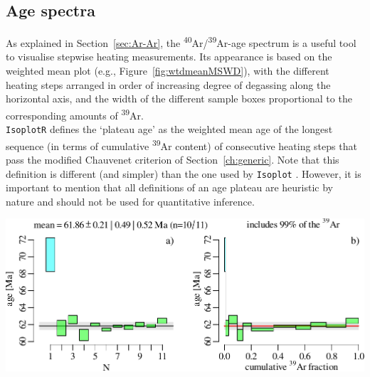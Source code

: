 \begin{refsection}
\section{Age spectra}\label{sec:agespectra}

As explained in Section~\ref{sec:Ar-Ar}, the
\textsuperscript{40}Ar/\textsuperscript{39}Ar-age spectrum is a useful
tool to visualise stepwise heating measurements. Its appearance is
based on the weighted mean plot (e.g., Figure~\ref{fig:wtdmeanMSWD}),
with the different heating steps arranged in order of increasing
degree of degassing along the horizontal axis, and the width of the
different sample boxes proportional to the corresponding amounts of
\textsuperscript{39}Ar.\\

\texttt{IsoplotR} defines the `plateau age' as the weighted mean age
of the longest sequence (in terms of cumulative \textsuperscript{39}Ar
content) of consecutive heating steps that pass the modified Chauvenet
criterion of Section~\ref{ch:generic}. Note that this definition is
different (and simpler) than the one used by \texttt{Isoplot}
\citep{ludwig2003}. However, it is important to mention that all
definitions of an age plateau are heuristic by nature and should not
be used for quantitative inference.

\begin{center}
\includegraphics[width=.8\textwidth]{../figures/agespectrum.pdf}
\label{fig:agespectrum}
\end{center}

\printbibliography[heading=subbibliography]

\end{refsection}
